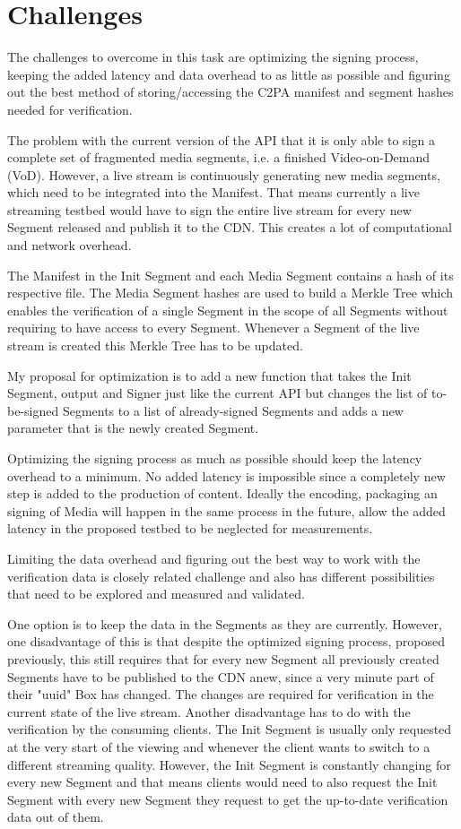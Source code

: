 \documentclass[a4paper]{article}
\begin{document}
\section{Challenges}

The challenges to overcome in this task are optimizing the signing process, keeping the added latency and data overhead to as little as possible and figuring out the best method of storing/accessing the C2PA manifest and segment hashes needed for verification.

The problem with the current version of the API that it is only able to sign a complete set of fragmented media segments, i.e. a finished Video-on-Demand (VoD). However, a live stream is continuously generating new media segments, which need to be integrated into the Manifest. That means currently a live streaming testbed would have to sign the entire live stream for every new Segment released and publish it to the CDN. This creates a lot of computational and network overhead.

The Manifest in the Init Segment and each Media Segment contains a hash of its respective file. The Media Segment hashes are used to build a Merkle Tree which enables the verification of a single Segment in the scope of all Segments without requiring to have access to every Segment. Whenever a Segment of the live stream is created this Merkle Tree has to be updated.

My proposal for optimization is to add a new function that takes the Init Segment, output and Signer just like the current API but changes the list of to-be-signed Segments to a list of already-signed Segments and adds a new parameter that is the newly created Segment.

Optimizing the signing process as much as possible should keep the latency overhead to a minimum. No added latency is impossible since a completely new step is added to the production of content. Ideally the encoding, packaging an signing of Media will happen in the same process in the future, allow the added latency in the proposed testbed to be neglected for measurements.

Limiting the data overhead and figuring out the best way to work with the verification data is closely related challenge and also has different possibilities that need to be explored and measured and validated.

One option is to keep the data in the Segments as they are currently. However, one disadvantage of this is that despite the optimized signing process, proposed previously, this still requires that for every new Segment all previously created Segments have to be published to the CDN anew, since a very minute part of their "uuid" Box has changed. The changes are required for verification in the current state of the live stream. Another disadvantage has to do with the verification by the consuming clients. The Init Segment is usually only requested at the very start of the viewing and whenever the client wants to switch to a different streaming quality. However, the Init Segment is constantly changing for every new Segment and that means clients would need to also request the Init Segment with every new Segment they request to get the up-to-date verification data out of them.
\end{document}
